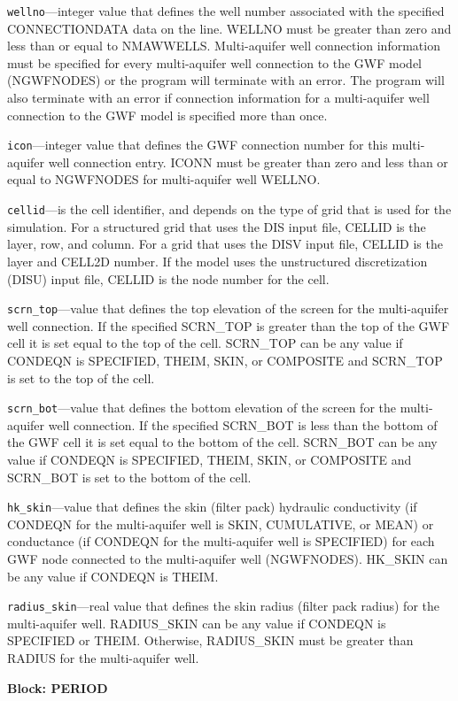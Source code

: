 \begin{description}
\item \texttt{wellno}---integer value that defines the well number associated with the specified CONNECTIONDATA data on the line. WELLNO must be greater than zero and less than or equal to NMAWWELLS. Multi-aquifer well connection information must be specified for every multi-aquifer well connection to the GWF model (NGWFNODES) or the program will terminate with an error.  The program will also terminate with an error if connection information for a multi-aquifer well connection to the GWF model is specified more than once.

\item \texttt{icon}---integer value that defines the GWF connection number for this multi-aquifer well connection entry. ICONN must be greater than zero and less than or equal to NGWFNODES for multi-aquifer well WELLNO.

\item \texttt{cellid}---is the cell identifier, and depends on the type of grid that is used for the simulation.  For a structured grid that uses the DIS input file, CELLID is the layer, row, and column.   For a grid that uses the DISV input file, CELLID is the layer and CELL2D number.  If the model uses the unstructured discretization (DISU) input file, CELLID is the node number for the cell.

\item \texttt{scrn\_top}---value that defines the top elevation of the screen for the multi-aquifer well connection. If the specified SCRN\_TOP is greater than the top of the GWF cell it is set equal to the top of the cell.  SCRN\_TOP can be any value if CONDEQN is SPECIFIED, THEIM, SKIN, or COMPOSITE and SCRN\_TOP is set to the top of the cell.

\item \texttt{scrn\_bot}---value that defines the bottom elevation of the screen for the multi-aquifer well connection. If the specified SCRN\_BOT is less than the bottom of the GWF cell it is set equal to the bottom of the cell.  SCRN\_BOT can be any value if CONDEQN is SPECIFIED, THEIM, SKIN, or COMPOSITE and SCRN\_BOT is set to the bottom of the cell.

\item \texttt{hk\_skin}---value that defines the skin (filter pack) hydraulic conductivity (if CONDEQN for the multi-aquifer well is SKIN, CUMULATIVE, or MEAN) or conductance (if CONDEQN for the multi-aquifer well is SPECIFIED) for each GWF node connected to the multi-aquifer well (NGWFNODES). HK\_SKIN can be any value if CONDEQN is THEIM.

\item \texttt{radius\_skin}---real value that defines the skin radius (filter pack radius) for the multi-aquifer well. RADIUS\_SKIN can be any value if CONDEQN is SPECIFIED or THEIM. Otherwise, RADIUS\_SKIN must be greater than RADIUS for the multi-aquifer well.

\end{description}
\item \textbf{Block: PERIOD}

